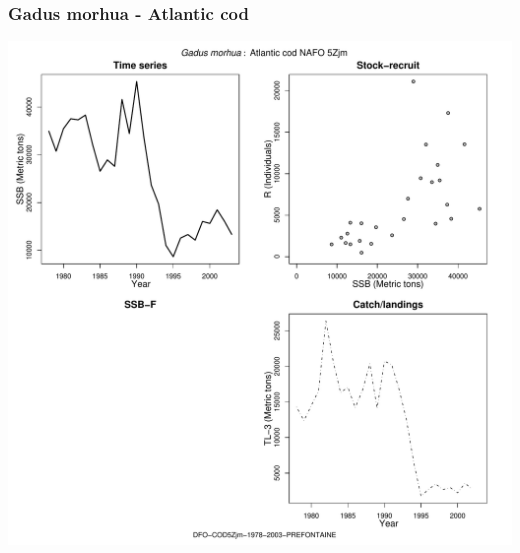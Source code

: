 \subsubsection{Gadus morhua - Atlantic cod}
\begin{center}
\includegraphics[width=1.2\textwidth]{../R/figures/DFO-COD5Zjm-1978-2003-PREFONTAINE.pdf}
\end{center}

